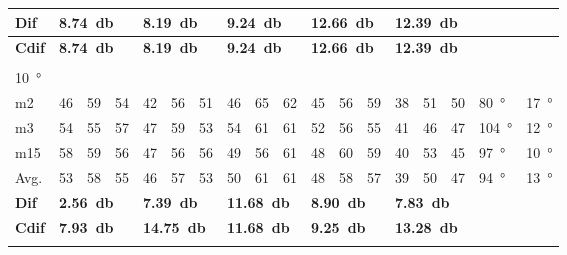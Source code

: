 \begin{table}[H]
\begin{tabular}{l|l|l|l|l|l|l|l|l|l|l|l|l|l|l|l|l|l}
\textbf{Dif} & \multicolumn{3}{l|}{\textbf{\SI{8.74}{\decibel}}} & \multicolumn{3}{l|}{\textbf{\SI{8.19}{\decibel}}} & \multicolumn{3}{l|}{\textbf{\SI{9.24}{\decibel}}} & \multicolumn{3}{l|}{\textbf{\SI{12.66}{\decibel}}} &  \multicolumn{3}{l|}{\textbf{\SI{12.39}{\decibel}}} &  \multicolumn{2}{l}{}  \\ \hline 
\textbf{Cdif} & \multicolumn{3}{l|}{\textbf{\SI{8.74}{\decibel}}} & \multicolumn{3}{l|}{\textbf{\SI{8.19}{\decibel}}} & \multicolumn{3}{l|}{\textbf{\SI{9.24}{\decibel}}} & \multicolumn{3}{l|}{\textbf{\SI{12.66}{\decibel}}} & \multicolumn{3}{l|}{\textbf{\SI{12.39}{\decibel}}}  &   \multicolumn{2}{l}{}   \\ 
 \multicolumn{18}{l}{ } \\                             
\SI{10}{\degree}   & \multicolumn{3}{l|}{} & \multicolumn{3}{l|}{} & \multicolumn{3}{l|}{} & \multicolumn{3}{l|}{} &  \multicolumn{3}{l|}{}   &  \multicolumn{2}{l}{} \\  \hline
m2    &  46    &  59    &  54    &  42    &  56    &   51   &  46    &   65    &   62   &   45    &  56    &  59    & 38 & 51 &50   & \SI{80}{\degree} & \SI{17}{\degree} \\
m3    &  54    &  55    &  57    &   47   &  59    &   53   &   54   &  61     &   61   &   52    & 56     &  55    & 41 & 46 &47  & \SI{104}{\degree} & \SI{12}{\degree} \\
m15  &  58    &  59    &  56    &  47    & 56     &   56   &   49   &   56    &   61   &    48   &   60   &  59    & 40 & 53 &45   & \SI{97}{\degree} & \SI{10}{\degree}\\ \hline
Avg. &  53    & 58     & 55     & 46     &   57   & 53     &  50    &  61     &  61    &  48     & 58     & 57     & 39 & 50 &  47 & \SI{94}{\degree} & \SI{13}{\degree} \\ \hline  
\textbf{Dif} & \multicolumn{3}{l|}{\textbf{\SI{2.56}{\decibel}}} & \multicolumn{3}{l|}{\textbf{\SI{7.39}{\decibel}}} & \multicolumn{3}{l|}{\textbf{\SI{11.68}{\decibel}}} & \multicolumn{3}{l|}{\textbf{\SI{8.90}{\decibel}}} & \multicolumn{3}{l|}{\textbf{\SI{7.83}{\decibel}}} &  \multicolumn{2}{l}{} \\     \hline 
\textbf{Cdif} & \multicolumn{3}{l|}{\textbf{\SI{7.93}{\decibel}}} & \multicolumn{3}{l|}{\textbf{\SI{14.75}{\decibel}}} & \multicolumn{3}{l|}{\textbf{\SI{11.68}{\decibel}}} & \multicolumn{3}{l|}{\textbf{\SI{9.25}{\decibel}}} & \multicolumn{3}{l|}{\textbf{\SI{13.28}{\decibel}}}  &   \multicolumn{2}{l}{}   \\  
\multicolumn{18}{l}{ } \\                

\end{tabular}
\end{table}
